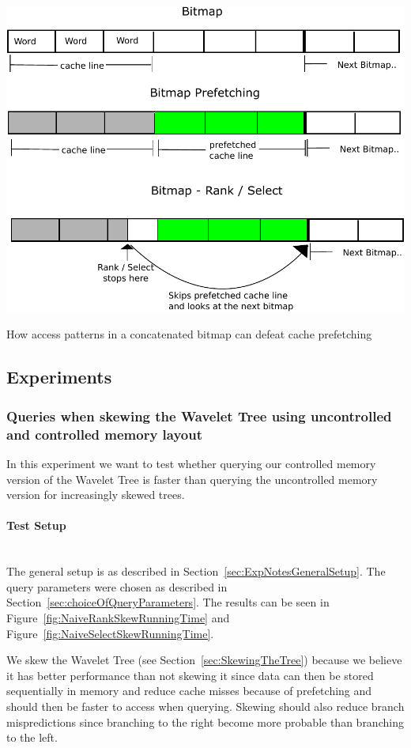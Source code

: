 \figureBegin
\label{fig:QueryPrefetchFigure}
\includegraphics[width=\textwidth]{QueryPrefetchFigure.pdf}
\caption{How access patterns in a concatenated bitmap can defeat cache prefetching}
\figureEnd



\subsection{Experiments}

\subsubsection{Queries when skewing the Wavelet Tree using uncontrolled and controlled memory layout}
In this experiment we want to test whether querying our controlled memory version of the Wavelet Tree is faster than querying the uncontrolled memory version for increasingly skewed trees. 

\paragraph{Test Setup}~\\
The general setup is as described in Section~\ref{sec:ExpNotesGeneralSetup}.
The query parameters were chosen as described in Section~\ref{sec:choiceOfQueryParameters}.
The results can be seen in Figure~\ref{fig:NaiveRankSkewRunningTime} and Figure~\ref{fig:NaiveSelectSkewRunningTime}.

We skew the Wavelet Tree (see Section~\ref{sec:SkewingTheTree}) because we believe it has better performance than not skewing it since data can then be stored sequentially in memory and reduce cache misses because of prefetching and should then be faster to access when querying.
Skewing should also reduce branch mispredictions since branching to the right become more probable than branching to the left. 

